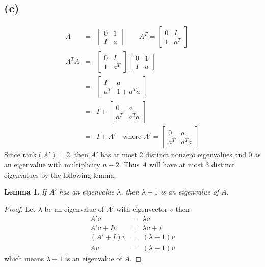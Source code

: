 \documentclass[11pt]{article}
\newtheorem{lemma}[proposition]{Lemma}
\theoremstyle{definition}
\theoremstyle{remark}
\theoremstyle{plain}
\begin{document}
\subsection*{(c)}
\begin{eqnarray*}
  A&=&\left[
       \begin{array}{cc}
         0&1\\
         I&a
       \end{array}\right]\qquad A^T=\left[
            \begin{array}{cc}
              0&I\\
              1&a^T
            \end{array}\right]\\
  A^TA&=&\left[
            \begin{array}{cc}
              0&I\\
              1&a^T
            \end{array}\right]\left[
       \begin{array}{cc}
         0&1\\
         I&a
       \end{array}\right]\\
   &=&\left[
       \begin{array}{cc}
         I&a\\
         a^T&1+a^Ta
       \end{array}\right]\\
   &=&I+\left[
       \begin{array}{cc}
         0&a\\
         a^T&a^Ta
       \end{array}\right]\\
   &=&I+A'\quad\textrm{where }A'=\left[
       \begin{array}{cc}
         0&a\\
         a^T&a^Ta
       \end{array}\right]
\end{eqnarray*}
Since $\textrm{rank}\left(A'\right)=2$, then $A'$ has at most 2 distinct nonzero eigenvalues and 0 as an eigenvalue with multiplicity $n-2$. Thus $A$ will have at most 3 distinct eigenvalues by the following lemma.

\begin{lemma}
  If $A'$ has an eigenvalue $\lambda$, then $\lambda+1$ is an eigenvalue of $A$.
\end{lemma}
\begin{proof}
Let $\lambda$ be an eigenvalue of $A'$ with eigenvector $v$ then
\begin{eqnarray*}
  A'v&=&\lambda v\\
  A'v+Iv&=&\lambda v+v\\
  \left(A'+I\right)v&=&\left(\lambda+1\right)v\\
  Av&=&\left(\lambda+1\right)v
\end{eqnarray*}
which means $\lambda+1$ is an eigenvalue of $A$.
\end{proof}
\end{document}

